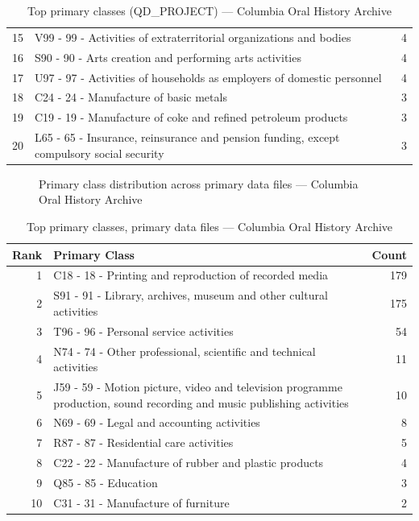 \begin{table}[H]
\begin{tabular}{r p{10cm} r}
    15 & V99 - 99 - Activities of extraterritorial organizations and bodies & 4 \\
    16 & S90 - 90 - Arts creation and performing arts activities & 4 \\
    17 & U97 - 97 - Activities of households as employers of domestic personnel & 4 \\
    18 & C24 - 24 - Manufacture of basic metals & 3 \\
    19 & C19 - 19 - Manufacture of coke and refined petroleum products & 3 \\
    20 & L65 - 65 - Insurance, reinsurance and pension funding, except compulsory social security & 3 \\
    \hline
    \end{tabular}
    \caption{Top primary classes (QD\_PROJECT) --- Columbia Oral History Archive}
\end{table}

\clearpage

\begin{figure}[H]
    \centering
    
    \caption{Primary class distribution across primary data files --- Columbia Oral History Archive}
\end{figure}

\begin{table}[H]
    \centering
    \begin{tabular}{r p{10cm} r}
    \hline
    \textbf{Rank} & \textbf{Primary Class} & \textbf{Count} \\
    \hline
    1 & C18 - 18 - Printing and reproduction of recorded media & 179 \\
    2 & S91 - 91 - Library, archives, museum and other cultural activities & 175 \\
    3 & T96 - 96 - Personal service activities & 54 \\
    4 & N74 - 74 - Other professional, scientific and technical activities & 11 \\
    5 & J59 - 59 - Motion picture, video and television programme production, sound recording and music publishing activities & 10 \\
    6 & N69 - 69 - Legal and accounting activities & 8 \\
    7 & R87 - 87 - Residential care activities & 5 \\
    8 & C22 - 22 - Manufacture of rubber and plastic products & 4 \\
    9 & Q85 - 85 - Education & 3 \\
    10 & C31 - 31 - Manufacture of furniture & 2 \\
    \hline
    \end{tabular}
    \caption{Top primary classes, primary data files --- Columbia Oral History Archive}
\end{table}

